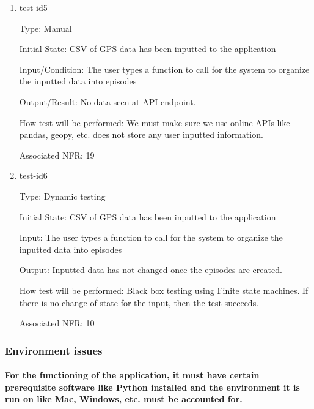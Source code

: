 \documentclass[12pt, titlepage]{article}
\begin{document}
\begin{enumerate}

\item{test-id5\\}

Type: Manual
					
Initial State: CSV of GPS data has been inputted to the application
					
Input/Condition: The user types a function to call for the system to organize the
inputted data into episodes
					
Output/Result: No data seen at API endpoint.
					
How test will be performed: We must make sure we use online APIs like pandas, geopy, etc. does not store any user inputted information.

Associated NFR: 19

\item{test-id6\\}

Type: Dynamic testing
					
Initial State: CSV of GPS data has been inputted to the application
					
Input: The user types a function to call for the system to organize the
inputted data into episodes
					
Output: Inputted data has not changed once the episodes are created.
					
How test will be performed: Black box testing using Finite state machines. If there is no change of state for the input, then the test succeeds. 

Associated NFR: 10

\end{enumerate}

\subsubsection{Environment issues}
		
\paragraph{For the functioning of the application, it must have certain prerequisite software like Python installed and the environment it is run on like Mac, Windows, etc. must be accounted for.}
\end{document}
